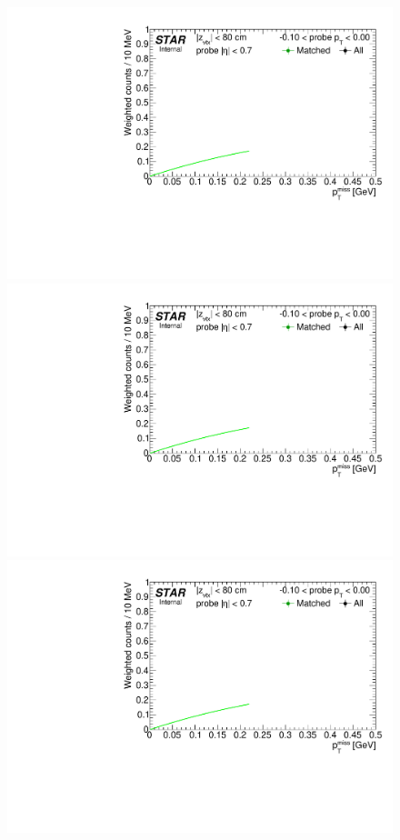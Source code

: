 \begin{figure}[h!]
{}~~~~
\parbox{0.24\textwidth}{ 
  \centering
  \includegraphics[width=\linewidth,page=6]{graphics/correctionsToEff/TOF_tagAndProbe/Fitting_effVsPt_data.CPT2.pdf}\\
  \includegraphics[width=\linewidth,page=8]{graphics/correctionsToEff/TOF_tagAndProbe/Fitting_effVsPt_data.CPT2.pdf}\\
  \includegraphics[width=\linewidth,page=10]{graphics/correctionsToEff/TOF_tagAndProbe/Fitting_effVsPt_data.CPT2.pdf}\\[84pt]

}
\end{figure}
